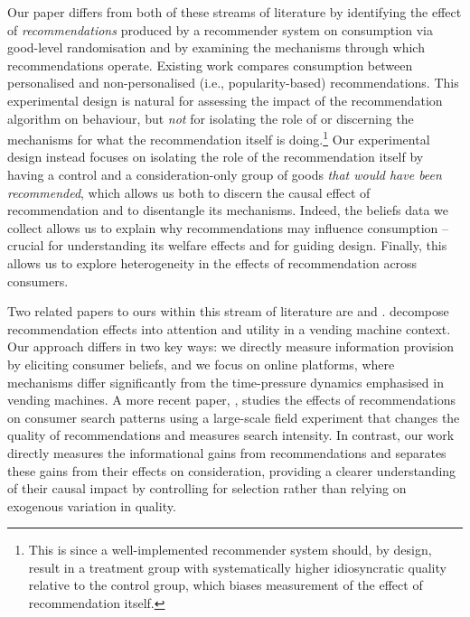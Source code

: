 \documentclass[12pt]{article}
\theoremstyle{newtheorem}
\begin{document}
Our paper differs from both of these streams of literature by identifying the effect of \emph{recommendations} produced by a recommender system on consumption via good-level randomisation and by examining the mechanisms through which recommendations operate. 
Existing work compares consumption between personalised and non-personalised (i.e., popularity-based) recommendations. 
This experimental design is natural for assessing the impact of the recommendation algorithm on behaviour, but \emph{not} for isolating the role of or discerning the mechanisms for what the recommendation itself is doing.\footnote{
    This is since a well-implemented recommender system should, by design, result in a treatment group with systematically higher idiosyncratic quality relative to the control group, which biases measurement of the effect of recommendation itself.
} 
Our experimental design instead focuses on isolating the role of the recommendation itself by having a control and a consideration-only group of goods \emph{that would have been recommended}, which allows us both to discern the causal effect of recommendation and to disentangle its mechanisms. 
Indeed, the beliefs data we collect allows us to explain why recommendations may influence consumption -- crucial for understanding its welfare effects and for guiding design. Finally, this allows us to explore heterogeneity in the effects of recommendation across consumers.


Two related papers to ours within this stream of literature are \citet{kawaguchi2021designing} and \citet{ChenChanZhangLiuWu2023WP}. 
\citet{kawaguchi2021designing} decompose recommendation effects into attention and utility in a vending machine context. 
Our approach differs in two key ways: we directly measure information provision by eliciting consumer beliefs, and we focus on online platforms, where mechanisms differ significantly from the time-pressure dynamics emphasised in vending machines.
A more recent paper, \citet{ChenChanZhangLiuWu2023WP}, studies the effects of recommendations on consumer search patterns using a large-scale field experiment that changes the quality of recommendations and measures search intensity. 
In contrast, our work directly measures the informational gains from recommendations and separates these gains from their effects on consideration, providing a clearer understanding of their causal impact by controlling for selection rather than relying on exogenous variation in quality. 
\end{document}
